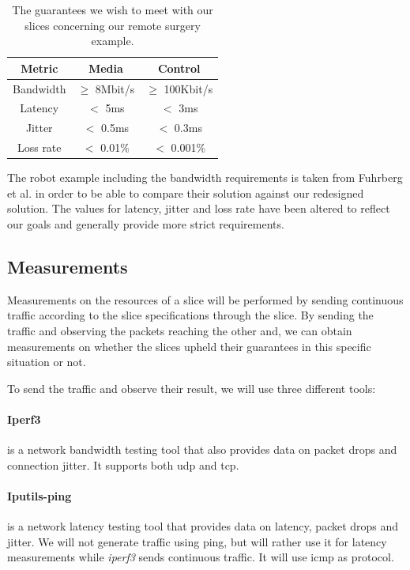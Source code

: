 \begin{table}[ht]
    \centering
    \begin{tabular}{ |c|c|c| }
    \hline
    \textbf{Metric} & \textbf{Media} & \textbf{Control} \\
    \hline
         Bandwidth & $\geq$ 8Mbit/s & $\geq$ 100Kbit/s \\
         Latency   & $<$ 5ms     & $<$ 3ms      \\
         Jitter    & $<$ 0.5ms  & $<$ 0.3ms   \\
         Loss rate & $<$ 0.01\% & $<$ 0.001\% \\
    \hline
    \end{tabular}
    \caption[Slice \acrshort{qos} guarantees in our remote surgery example]{The guarantees we wish to meet with our slices concerning our remote surgery example.}
    \label{table:slices}
\end{table}

The robot example including the bandwidth requirements is taken from Fuhrberg et al. \cite{SE4} in order to be able to compare their solution against our redesigned solution. The values for latency, jitter and loss rate have been altered to reflect our goals and generally provide more strict requirements.

\subsection{Measurements}
\label{measurements}
Measurements on the resources of a slice will be performed by sending continuous traffic according to the slice specifications through the slice. By sending the traffic and observing the packets reaching the other and, we can obtain measurements on whether the slices upheld their guarantees in this specific situation or not.

To send the traffic and observe their result, we will use three different tools:

\paragraph{Iperf3} \cite{iperf3} is a network bandwidth testing tool that also provides data on packet drops and connection jitter. It supports both \acrshort{udp} and \acrshort{tcp}.

\paragraph{Iputils-ping} \cite{iputils} is a network latency testing tool that provides data on latency, packet drops and jitter. We will not generate traffic using ping, but will rather use it for latency measurements while \textit{iperf3} sends continuous traffic. It will use \acrshort{icmp} as protocol.

